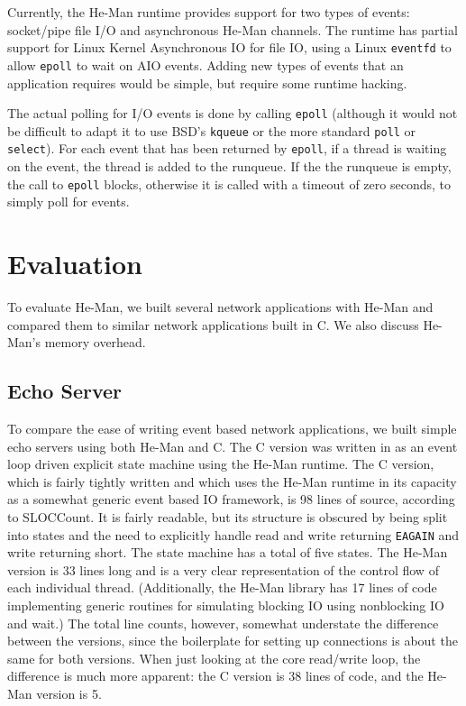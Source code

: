 \documentclass[preprint]{sigplanconf}
\renewcommand{\t}{\texttt}
\begin{document}
Currently, the He-Man runtime provides support for two types of
events: socket/pipe file I/O and asynchronous He-Man channels.  The
runtime has partial support for Linux Kernel Asynchronous IO for file
IO, using a Linux \t{eventfd} to allow \t{epoll} to wait on AIO
events. Adding new types of events that an application requires would
be simple, but require some runtime hacking.

The actual polling for I/O events is done by calling \t{epoll}
(although it would not be difficult to adapt it to use BSD's
\t{kqueue} or the more standard \t{poll} or \t{select}).  For each
event that has been returned by \t{epoll}, if a thread is waiting on
the event, the thread is added to the runqueue. If the the runqueue is
empty, the call to \t{epoll} blocks, otherwise it is called with a
timeout of zero seconds, to simply poll for events.

\section{Evaluation}\label{sec:evaluation}

To evaluate He-Man, we built several network applications with He-Man
and compared them to similar network applications built in C.  We also
discuss He-Man's memory overhead.

\subsection{Echo Server}

To compare the ease of writing event based network applications, we
built simple echo servers using both He-Man and C. The C version was
written in as an event loop driven explicit state machine using the
He-Man runtime. The C version, which is fairly tightly written and
which uses the He-Man runtime in its capacity as a somewhat generic
event based IO framework, is 98 lines of source, according to
SLOCCount. It is fairly readable, but its structure is obscured by
being split into states and the need to explicitly handle read and
write returning \t{EAGAIN} and write returning short. The state
machine has a total of five states. The He-Man version is 33 lines
long and is a very clear representation of the control flow of each
individual thread. (Additionally, the He-Man library has 17 lines of
code implementing generic routines for simulating blocking IO using
nonblocking IO and wait.) The total line counts, however, somewhat
understate the difference between the versions, since the boilerplate
for setting up connections is about the same for both versions. When
just looking at the core read/write loop, the difference is much more
apparent: the C version is 38 lines of code, and the He-Man version is
5.
\end{document}

